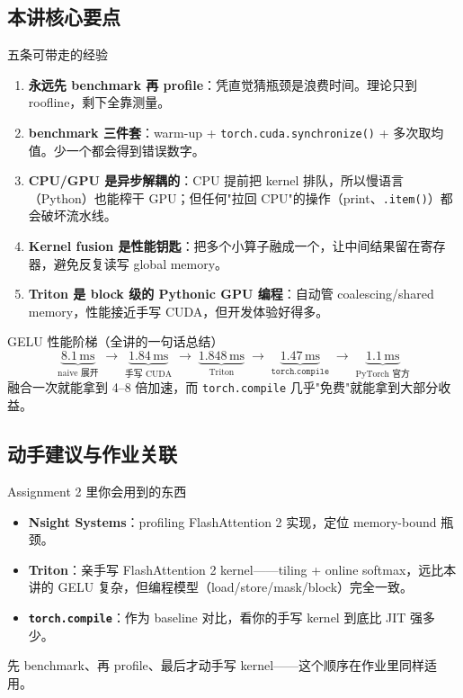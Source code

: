 \documentclass[a4paper]{article}
\begin{document}
\subsection{本讲核心要点}

\begin{knowledgebox}{五条可带走的经验}
\begin{enumerate}
    \item \textbf{永远先 benchmark 再 profile}：凭直觉猜瓶颈是浪费时间。理论只到 roofline，剩下全靠测量。
    \item \textbf{benchmark 三件套}：warm-up + \texttt{torch.cuda.synchronize()} + 多次取均值。少一个都会得到错误数字。
    \item \textbf{CPU/GPU 是异步解耦的}：CPU 提前把 kernel 排队，所以慢语言（Python）也能榨干 GPU；但任何"拉回 CPU"的操作（print、\texttt{.item()}）都会破坏流水线。
    \item \textbf{Kernel fusion 是性能钥匙}：把多个小算子融成一个，让中间结果留在寄存器，避免反复读写 global memory。
    \item \textbf{Triton 是 block 级的 Pythonic GPU 编程}：自动管 coalescing/shared memory，性能接近手写 CUDA，但开发体验好得多。
\end{enumerate}
\end{knowledgebox}

\begin{importantbox}{GELU 性能阶梯（全讲的一句话总结）}
\[
\underbrace{8.1\,\text{ms}}_{\text{naive 展开}} \;\to\; \underbrace{1.84\,\text{ms}}_{\text{手写 CUDA}} \;\to\; \underbrace{1.848\,\text{ms}}_{\text{Triton}} \;\to\; \underbrace{1.47\,\text{ms}}_{\texttt{torch.compile}} \;\to\; \underbrace{1.1\,\text{ms}}_{\text{PyTorch 官方}}
\]
融合一次就能拿到 4--8 倍加速，而 \texttt{torch.compile} 几乎"免费"就能拿到大部分收益。
\end{importantbox}

\subsection{动手建议与作业关联}

\begin{practicebox}{Assignment 2 里你会用到的东西}
\begin{itemize}
    \item \textbf{Nsight Systems}：profiling FlashAttention 2 实现，定位 memory-bound 瓶颈。
    \item \textbf{Triton}：亲手写 FlashAttention 2 kernel——tiling + online softmax，远比本讲的 GELU 复杂，但编程模型（load/store/mask/block）完全一致。
    \item \textbf{\texttt{torch.compile}}：作为 baseline 对比，看你的手写 kernel 到底比 JIT 强多少。
\end{itemize}
先 benchmark、再 profile、最后才动手写 kernel——这个顺序在作业里同样适用。
\end{practicebox}
\end{document}
